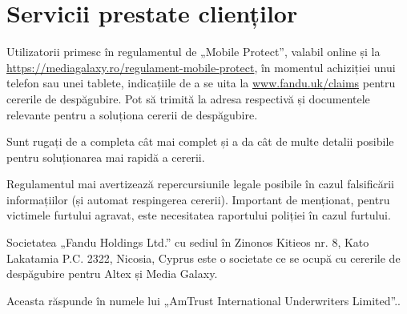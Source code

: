 \section{Servicii prestate clienților}
	Utilizatorii primesc în regulamentul de „Mobile Protect”, valabil online și la \url{https://mediagalaxy.ro/regulament-mobile-protect}\cite{media_galaxy}, în momentul achiziției unui telefon sau unei tablete, indicațiile de a se uita la \url{www.fandu.uk/claims} pentru cererile de despăgubire.
	Pot să trimită la adresa respectivă și documentele relevante pentru a soluționa cererii de despăgubire.

	Sunt rugați de a completa cât mai complet și a da cât de multe detalii posibile pentru soluționarea mai rapidă a cererii.

	Regulamentul mai avertizează repercursiunile legale posibile în cazul falsificării informațiilor (și automat respingerea cererii).
	Important de menționat, pentru victimele furtului agravat, este necesitatea raportului poliției în cazul furtului.

	Societatea „Fandu Holdings Ltd.” cu sediul în Zinonos Kitieos nr. 8, Kato Lakatamia P.C. 2322, Nicosia, Cyprus\cite{fandu_uk} este o societate ce se ocupă cu cererile de despăgubire pentru Altex și Media Galaxy\cite{media_galaxy}.

	Aceasta răspunde în numele lui „AmTrust International Underwriters Limited”.\cite{media_galaxy}.
